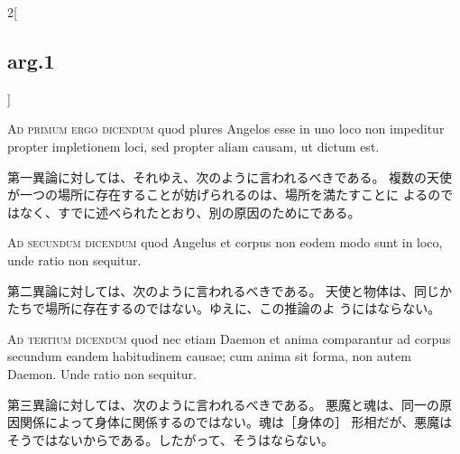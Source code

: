 \documentclass[paper=a4paper,fontsize=10pt,jafontsize=9pt,titlepage]{jlreq}
\begin{document}
\begin{paracol}{2}[\subsection{arg.1}]
\switchcolumn*[\subsection{ad.1}]

{\scshape Ad primum ergo dicendum} quod plures Angelos
 esse in uno loco non impeditur propter impletionem loci, sed propter
 aliam causam, ut dictum est.

\switchcolumn

第一異論に対しては、それゆえ、次のように言われるべきである。
複数の天使が一つの場所に存在することが妨げられるのは、場所を満たすことに
 よるのではなく、すでに述べられたとおり、別の原因のためにである。

\switchcolumn*[\subsection{ad.2}]

{\scshape Ad secundum dicendum} quod Angelus et corpus
 non eodem modo sunt in loco, unde ratio non sequitur.

\switchcolumn

第二異論に対しては、次のように言われるべきである。
天使と物体は、同じかたちで場所に存在するのではない。ゆえに、この推論のよ
 うにはならない。

\switchcolumn*[\subsection{ad.3}]

{\scshape Ad tertium dicendum} quod nec etiam Daemon et
anima comparantur ad corpus secundum eandem habitudinem causae; cum
anima sit forma, non autem Daemon. Unde ratio non sequitur.

\switchcolumn

第三異論に対しては、次のように言われるべきである。
悪魔と魂は、同一の原因関係によって身体に関係するのではない。魂は［身体の］
 形相だが、悪魔はそうではないからである。したがって、そうはならない。

\end{paracol}
\newpage
\end{document}
